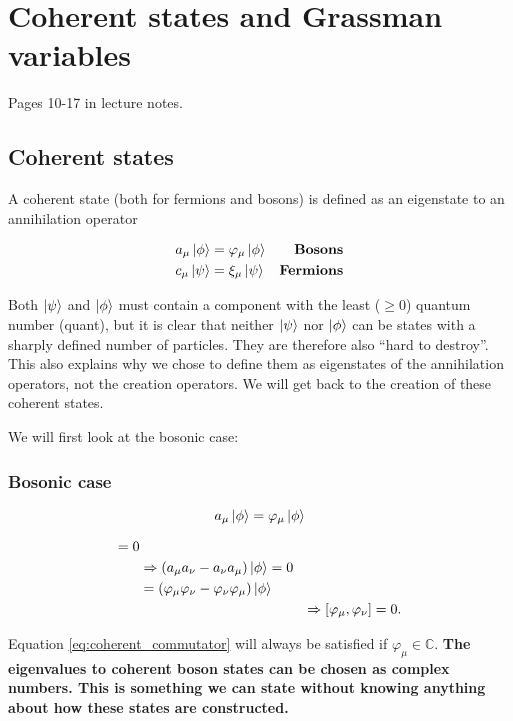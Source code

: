 \section{Coherent states and Grassman variables}
Pages 10-17 in lecture notes.

\subsection{Coherent states}
A coherent state (both for fermions and bosons) is defined as an eigenstate to an annihilation operator

\begin{align}
	a_\mu \ket{\phi} &= \varphi_\mu \ket{\phi} & \textbf{Bosons} \label{eq:def_boson_coherent_state}\\
	c_\mu \ket{\psi} &= \xi_\mu\ket{\psi} & \textbf{Fermions} \label{eq:def_fermion_coherent_state}
\end{align}

Both $\ket{\psi}$ and $\ket{\phi}$ must contain a component with the least ($\ge 0$) quantum number (quant), but it is clear that neither $\ket{\psi}$ nor $\ket{\phi}$ can be states with a sharply defined number of particles. They are therefore also ``hard to destroy''. This also explains why we chose to define them as eigenstates of the annihilation operators, not the creation operators. We will get back to the creation of these coherent states. 

We will first look at the bosonic case:
\subsubsection{Bosonic case}

\begin{equation}
a_\mu\ket{\phi} = \varphi_\mu\ket{\phi}
\end{equation}

\begin{align}
[a_\mu, a_{\nu}] = 0& &\nonumber \\
 &\Rightarrow \left(a_\mu a_{\nu} -a_{\nu}a_\mu\right)\ket{\phi} = 0 & \nonumber \\
&= \left(\varphi_\mu\varphi_{\nu} - \varphi_{\nu}\varphi_\mu\right)\ket{\phi} &\nonumber\\
&&\Rightarrow [\varphi_\mu, \varphi_\nu] = 0. \label{eq:coherent_commutator} 
\end{align}

Equation \eqref{eq:coherent_commutator} will always be satisfied if $\varphi_\mu \in \mathbb{C}$. \textbf{The eigenvalues to coherent boson states can be chosen as complex numbers. This is something we can state without knowing anything about how these states are constructed. }


